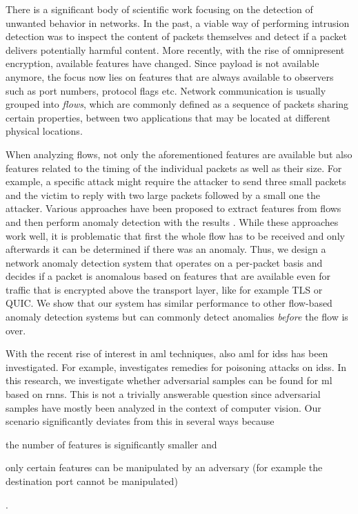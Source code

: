 \documentclass[conference]{IEEEtran}
\begin{document}
There is a significant body of scientific work focusing on the detection of unwanted behavior in networks. In the past, a viable way of performing intrusion detection was to inspect the content of packets themselves and detect if a packet delivers potentially harmful content. More recently, with the rise of omnipresent encryption, available features have changed. Since payload is not available anymore, the focus now lies on features that are always available to observers such as port numbers, protocol flags etc. Network communication is usually grouped into \textit{flows}, which are commonly defined as a sequence of packets sharing certain properties, between two applications that may be located at different physical locations.

When analyzing flows, not only the aforementioned features are available but also features related to the timing of the individual packets as well as their size. For example, a specific attack might require the attacker to send three small packets and the victim to reply with two large packets followed by a small one the attacker. Various approaches have been proposed to extract features from flows and then perform anomaly detection with the results \cite{meghdouri_analysis_2018}. While these approaches work well, it is problematic that first the whole flow has to be received and only afterwards it can be determined if there was an anomaly. Thus, we design a network anomaly detection system that operates on a per-packet basis and decides if a packet is anomalous based on features that are available even for traffic that is encrypted above the transport layer, like for example TLS or QUIC.
We show that our system has similar performance to other flow-based anomaly detection systems but can commonly detect anomalies \textit{before} the flow is over. 


With the recent rise of interest in \gls{aml} techniques, also \gls{aml} for \glspl{ids} has been investigated. For example, \cite{Bachl2019} investigates remedies for poisoning attacks on \glspl{ids}.
In this research, we investigate whether adversarial samples can be found for \gls{ml} based on \glspl{rnn}. This is not a trivially answerable question since adversarial samples have mostly been analyzed in the context of computer vision. Our scenario significantly deviates from this in several ways because \begin{enumerate*}
\item the number of features is significantly smaller and
\item only certain features can be manipulated by an adversary (for example the destination port cannot be manipulated)
\end{enumerate*}.
\end{document}
